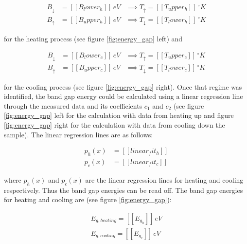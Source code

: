 \documentclass[a4paper]{article}
\begin{document}
\begin{subequations}
\begin{align}
B_{\downarrow} &= [[B_lower_h]] \, eV &\implies T_{\uparrow} = [[T_upper_h]] \, ^{\circ}K\\
B_{\uparrow} &= [[B_upper_h]] \, eV &\implies T_{\downarrow} = [[T_lower_h]] \, ^{\circ}K
\end{align}
\end{subequations}

for the heating process (see figure \ref{fig:energy_gap} left) and 

\begin{subequations}
\begin{align}
B_{\downarrow} &= [[B_lower_c]] \, eV &\implies T_{\uparrow} = [[T_upper_c]] \, ^{\circ}K \\
B_{\uparrow} &= [[B_upper_c]] \, eV &\implies T_{\downarrow} = [[T_lower_c]] \, ^{\circ}K
\end{align}
\end{subequations}

for the cooling process (see figure \ref{fig:energy_gap} right). Once that regime was identified, the band gap energy could be calculated using a linear regression line through the measured data and its coefficients $c_1$ and $c_2$ (see figure \ref{fig:energy_gap} left for the calculation with data from heating up and figure \ref{fig:energy_gap} right for the calculation with data from cooling down the sample). The linear regression lines are as follows:

\begin{subequations}
\begin{align}
p_{h}(x) &= [[linear_fit_h]] \\
p_{c}(x) &= [[linear_fit_c]]
\end{align}
\end{subequations}

where $p_h(x)$ and $p_c(x)$ are the linear regression lines for heating and cooling respectively. Thus the band gap energies can be read off. The band gap energies for heating and cooling are (see figure \ref{fig:energy_gap}):

\begin{subequations}
\begin{align}
E_{g,heating} = [[E_g_h]] \, eV \label{eq:egh} \\
E_{g,cooling} = [[E_g_c]] \, eV \label{eq:egc}
\end{align}
\end{subequations}
\end{document}
